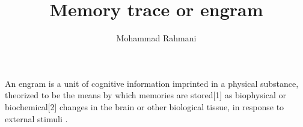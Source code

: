 \documentclass[a4paper]{article}
\title{Memory trace or engram}
\date{}
\author{Mohammad Rahmani}
\begin{document}
    \maketitle
    An engram is a unit of cognitive information imprinted in a physical substance, theorized to be the means by which memories are stored[1] as biophysical or biochemical[2] changes in the brain or other biological tissue, in response to external stimuli .
    
    
    
    \cite{sakaguchi-2012-catching-the-engram-strategies-to-examine-the-memory-trace}
    
    
    
\end{document}
